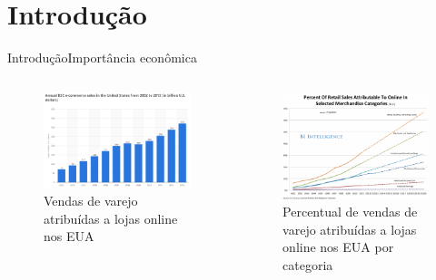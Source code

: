 \section[Introdução]{Introdução}


\begin{frame}{Introdução}{Importância econômica}
\begin{columns}[b] %

\begin{figure}[ht]
    \begin{center}
    \includegraphics[width=1\textwidth]{img/sales-ecommerce}\caption{Vendas de varejo atribuídas a lojas online nos EUA \cite{sales-ecommerce}}
    \end{center}
\end{figure}


\begin{figure}[ht]
    \begin{center}
    \includegraphics[width=1\textwidth]{img/crescimento-ecommerce}\caption{Percentual de vendas de varejo atribuídas a lojas online nos EUA por categoria \cite{crescimento-ecommerce}}
    \end{center}
\end{figure}




\end{columns}
\end{frame}
